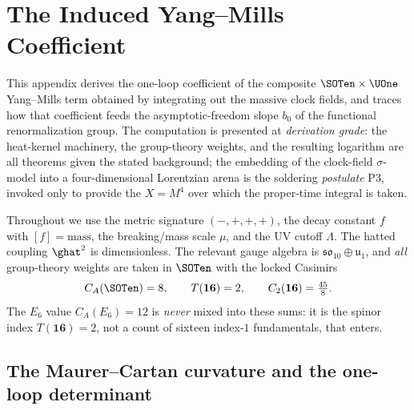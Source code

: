 \section{The Induced Yang--Mills Coefficient}
\label{sec:app-ym:main}

This appendix derives the one-loop coefficient of the composite
$\SOTen\times\UOne$ Yang--Mills term obtained by integrating out the
massive clock fields, and traces how that coefficient feeds the
asymptotic-freedom slope $b_{0}$ of the functional renormalization group.
The computation is presented at \emph{derivation grade}: the heat-kernel
machinery, the group-theory weights, and the resulting logarithm are all
theorems given the stated background; the embedding of the clock-field
$\sigma$-model into a four-dimensional Lorentzian arena is the soldering
\emph{postulate} P3, invoked only to provide the $X=M^{4}$ over which the
proper-time integral is taken.

Throughout we use the metric signature $(-,+,+,+)$, the decay constant
$f$ with $[f]=\text{mass}$, the breaking/mass scale $\mu$, and the UV
cutoff $\Lambda$. The hatted coupling $\ghat^{2}$ is dimensionless. The
relevant gauge algebra is $\mathfrak{so}_{10}\oplus\mathfrak u_{1}$, and
\emph{all} group-theory weights are taken in $\SOTen$ with the locked
Casimirs
\begin{equation}\label{eq:app-ym:casimirs}
  C_{A}(\SOTen)=8,\qquad
  T(\mathbf{16})=2,\qquad
  C_{2}(\mathbf{16})=\tfrac{45}{8}.
\end{equation}
The $E_{6}$ value $C_{A}(E_{6})=12$ is \emph{never} mixed into these
sums: it is the spinor index $T(\mathbf{16})=2$, not a count of sixteen
index-$1$ fundamentals, that enters.

\subsection{The Maurer--Cartan curvature and the one-loop determinant}
\label{sec:app-ym:setup}

